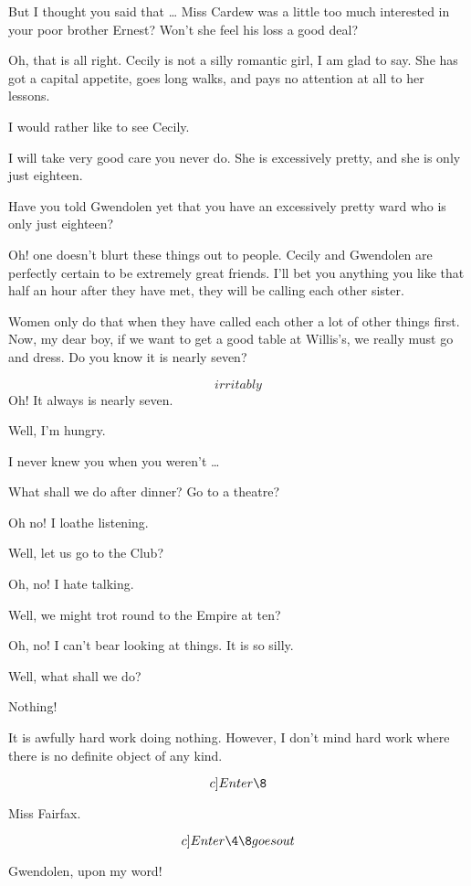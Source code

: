 \documentclass{book}
\begin{document}
\2  But I thought you said that \ldots{} Miss Cardew was a
little too much interested in your poor brother Ernest?  Won't she
feel his loss a good deal?

\1  Oh, that is all right.  Cecily is not a silly romantic girl,
I am glad to say.  She has got a capital appetite, goes long walks,
and pays no attention at all to her lessons.

\2  I would rather like to see Cecily.

\1  I will take very good care you never do.  She is excessively
pretty, and she is only just eighteen.

\2  Have you told Gwendolen yet that you have an excessively
pretty ward who is only just eighteen?

\1  Oh! one doesn't blurt these things out to people.  Cecily
and Gwendolen are perfectly certain to be extremely great friends.
I'll bet you anything you like that half an hour after they have
met, they will be calling each other sister.

\2  Women only do that when they have called each other a
lot of other things first.  Now, my dear boy, if we want to get a
good table at Willis's, we really must go and dress.  Do you know
it is nearly seven?

\1  \[irritably\]  Oh!  It always is nearly seven.

\2  Well, I'm hungry.

\1  I never knew you when you weren't \ldots{}

\2  What shall we do after dinner?  Go to a theatre?

\1  Oh no!  I loathe listening.

\2  Well, let us go to the Club?

\1  Oh, no!  I hate talking.

\2  Well, we might trot round to the Empire at ten?

\1  Oh, no!  I can't bear looking at things.  It is so silly.

\2  Well, what shall we do?

\1  Nothing!

\2  It is awfully hard work doing nothing.  However, I don't
mind hard work where there is no definite object of any kind.

\[c]Enter \8\]

\8  Miss Fairfax.

\[c]Enter \4  \8 goes out\]

\2  Gwendolen, upon my word!
\end{document}
